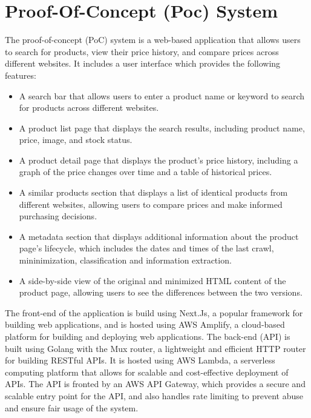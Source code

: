\section{Proof-Of-Concept (Poc) System}\label{sec:poc_system}
The proof-of-concept (PoC) system is a web-based application that allows users to search for products, view their price history, and compare prices across different websites.
It includes a user interface which provides the following features:
\begin{itemize}
    \item A search bar that allows users to enter a product name or keyword to search for products across different websites.
    \item A product list page that displays the search results, including product name, price, image, and stock status.
    \item A product detail page that displays the product's price history, including a graph of the price changes over time and a table of historical prices.
    \item A similar products section that displays a list of identical products from different websites, allowing users to compare prices and make informed purchasing decisions.
    \item A metadata section that displays additional information about the product page's lifecycle, which includes the dates and times of the last crawl, mininimization, classification and information extraction.
    \item A side-by-side view of the original and minimized HTML content of the product page, allowing users to see the differences between the two versions.
\end{itemize}

The front-end of the application is build using Next.Js, a popular framework for building web applications, and is hosted using AWS Amplify, a cloud-based platform for building and deploying web applications.
The back-end (API) is built using Golang with the Mux router, a lightweight and efficient HTTP router for building RESTful APIs.
It is hosted using AWS Lambda, a serverless computing platform that allows for scalable and cost-effective deployment of APIs.
The API is fronted by an AWS API Gateway, which provides a secure and scalable entry point for the API, and also handles rate limiting to prevent abuse and ensure fair usage of the system.

